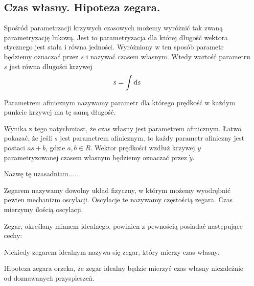 \subsection{Czas własny. Hipoteza zegara.}
Spośród parametrzacji krzywych czasowych
 możemy wyróżnić tak zwaną parametryzację łukową.
Jest to parametryzacja dla której długość 
wektora stycznego jest stała i równa jedności.
Wyróżniony w ten sposób parametr będziemy oznaczać przez 
$s$ i nazywać czasem własnym.
Wtedy wartość parametru $s$ jest równa długości krzywej
\begin{align}
s = \int \text{d} s
\end{align}
\begin{definition}
Parametrem afinicznym nazywamy parametr dla którego 
prędkość w każdym punkcie krzywej ma tę samą długość.
\end{definition}
Wynika z tego natychmiast, że czas własny jest parametrem afinicznym.
Łatwo pokazać, że jeśli $s$ jest 
parametrem afinicznym, to każdy parametr afiniczny 
jest postaci $a s+b$, gdzie $a,b\in R$.
Wektor prędkości wzdłuż krzywej $y$ parametryzowanej czasem 
własnym będziemy oznaczać przez $\dot{y}$.



Nazwę tę uzasadniam......


\begin{definition}
Zegarem nazywamy dowolny układ fizyczny, w którym możemy wyodrębnić pewien
mechanizm oscylacji. Oscylacje te nazywamy częstością zegara. Czas mierzymy
ilością oscylacji.
\end{definition}
Zegar, określany mianem idealnego, powinien z pewnością posiadać następujące 
cechy:

Niekiedy zegarem idealnym nazywa się zegar, który mierzy czas własny.

Hipoteza zegara orzeka, że zegar idealny będzie mierzyć 
czas własny niezależnie od doznawanych przyspieszeń. 

